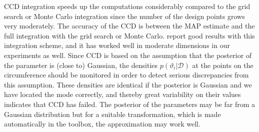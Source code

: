 \documentclass[twoside,11pt]{article}
\begin{document}
CCD integration speeds up the computations considerably compared to
the grid search or Monte Carlo integration since the number of the
design points grows very moderately. The accuracy of the CCD is
between the MAP estimate and the full integration with the grid
search or Monte Carlo. \citet{Rue+Martino+Chopin:2009} report good
results with this integration scheme, and it has worked well in
moderate dimensions in our experiments as well. 
Since CCD is based on the assumption that the posterior of the
parameter is (close to) Gaussian, the densities
$p(\vartheta_i|\mathcal{D})$ at the points on the circumference should
be monitored in order to detect serious discrepancies from this
assumption. These densities are identical if the posterior is Gaussian
and we have located the mode correctly, and thereby great variability
on their values indicates that CCD has failed. The posterior of the
parameters may be far from a Gaussian distribution but for a suitable
transformation, which is made automatically in the toolbox, the
approximation may work well.
\end{document}
